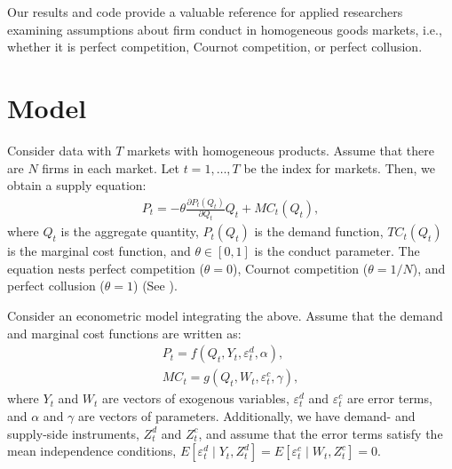 \documentclass[11pt, a4paper]{article}
\begin{document}
Our results and code provide a valuable reference for applied researchers examining assumptions about firm conduct in homogeneous goods markets, i.e., whether it is perfect competition, Cournot competition, or perfect collusion.

\section{Model}
Consider data with $T$ markets with homogeneous products.
Assume that there are $N$ firms in each market.
Let $t = 1,\ldots, T$ be the index for markets.
Then, we obtain a supply equation:
\begin{align}
     P_{t} = -\theta\frac{\partial P_{t}(Q_{t})}{\partial Q_{t}}Q_{t} + MC_{t}(Q_{t}),\label{eq:supply_equation}
\end{align}
where $Q_{t}$ is the aggregate quantity, $P_{t}(Q_{t})$ is the demand function, $TC_{t}(Q_{t})$ is the marginal cost function, and $\theta\in[0,1]$ is  the conduct parameter. 
The equation nests perfect competition ($\theta=0$), Cournot competition ($\theta=1/N$), and perfect collusion ($\theta=1$) (See \cite{bresnahan1982oligopoly}). 

Consider an econometric model integrating the above.
Assume that the demand and marginal cost functions are written as: 
\begin{align}
    P_{t} = f(Q_{t}, Y_{t}, \varepsilon^{d}_{t}, \alpha), \label{eq:demand}\\
    MC_{t} = g(Q_{t}, W_{t}, \varepsilon^{c}_{t}, \gamma),\label{eq:marginal_cost}
\end{align}
where $Y_{t}$ and $W_{t}$ are vectors of exogenous variables, $\varepsilon^{d}_{t}$ and $\varepsilon^{c}_{t}$ are error terms, and $\alpha$ and $\gamma$ are vectors of parameters.
Additionally, we have demand- and supply-side instruments, $Z^{d}_{t}$ and $Z^{c}_{t}$, and assume that the error terms satisfy the mean independence conditions, $E[\varepsilon^{d}_{t}\mid Y_{t}, Z^{d}_{t}] = E[\varepsilon^{c}_{t} \mid W_{t}, Z^{c}_{t}] =0$.
\end{document}
